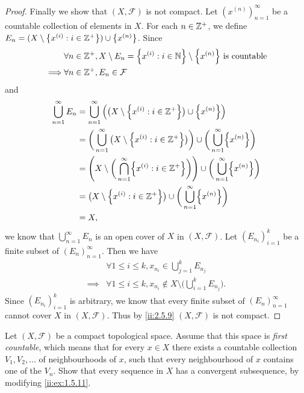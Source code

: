 \begin{proof}
  Finally we show that \((X, \mathcal{F})\) is not compact.
  Let \((x^{(n)})_{n = 1}^\infty\) be a countable collection of elements in \(X\).
  For each \(n \in \mathbb{Z}^+\), we define \(E_n = (X \setminus \left\lbrace x^{(i)} : i \in \mathbb{Z}^+\right\rbrace) \cup \left\lbrace x^{(n)}\right\rbrace\).
  Since
  \begin{align*}
             & \forall n \in \Z^+, X \setminus E_n = \set{x^{(i)} : i \in \N} \setminus \set{x^{(n)}} \text{ is countable} \\
    \implies & \forall n \in \Z^+, E_n \in \mathcal{F}
  \end{align*}
  and
  \begin{align*}
    \bigcup_{n = 1}^\infty E_n & = \bigcup_{n = 1}^\infty \Big(\big(X \setminus \set{x^{(i)} : i \in \Z^+}\big) \cup \set{x^{(n)}}\Big)                                        \\
                               & = \bigg(\bigcup_{n = 1}^\infty \big(X \setminus \set{x^{(i)} : i \in \Z^+}\big)\bigg) \cup \bigg(\bigcup_{n = 1}^\infty \set{x^{(n)}}\bigg)   \\
                               & = \Bigg(X \setminus \bigg(\bigcap_{n = 1}^\infty \set{x^{(i)} : i \in \Z^+}\bigg)\Bigg) \cup \bigg(\bigcup_{n = 1}^\infty \set{x^{(n)}}\bigg) \\
                               & = \big(X \setminus \set{x^{(i)} : i \in \Z^+}\big) \cup \bigg(\bigcup_{n = 1}^\infty \set{x^{(n)}}\bigg)                                      \\
                               & = X,
  \end{align*}
  we know that \(\bigcup_{n = 1}^\infty E_n\) is an open cover of \(X\) in \((X, \mathcal{F})\).
  Let \((E_{n_i})_{i = 1}^k\) be a finite subset of \((E_n)_{n = 1}^\infty\).
  Then we have
  \begin{align*}
             & \forall 1 \leq i \leq k, x_{n_i} \in \bigcup_{j = 1}^k E_{n_j}                             \\
    \implies & \forall 1 \leq i \leq k, x_{n_i} \notin X \setminus \bigg(\bigcup_{i = 1}^k E_{n_j}\bigg).
  \end{align*}
  Since \((E_{n_i})_{i = 1}^k\) is arbitrary, we know that every finite subset of \((E_n)_{n = 1}^\infty\) cannot cover \(X\) in \((X, \mathcal{F})\).
  Thus by \cref{ii:2.5.9} \((X, \mathcal{F})\) is not compact.
\end{proof}

\setcounter{ex}{8}
\begin{ex}\label{ii:ex:2.5.9}
  Let \((X, \mathcal{F})\) be a compact topological space.
  Assume that this space is \emph{first countable}, which means that for every \(x \in X\) there exists a countable collection \(V_1 , V_2 , \dots\) of neighbourhoods of \(x\), such that every neighbourhood of \(x\) contains one of the \(V_n\).
  Show that every sequence in \(X\) has a convergent subsequence, by modifying \cref{ii:ex:1.5.11}.
\end{ex}

